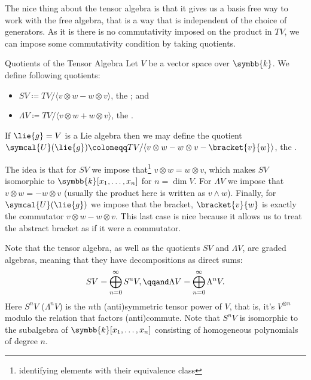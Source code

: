 \documentclass[fleqn]{NotesClass}
\renewcommand{\field}{\symbb{k}}
\newcommand{\universalEnveloping}{\symcal{U}}
\begin{document}
    The nice thing about the tensor algebra is that it gives us a basis free way to work with the free algebra, that is a way that is independent of the choice of generators.
    As it is there is no commutativity imposed on the product in \(TV\), we can impose some commutativity condition by taking quotients.
    
    \begin{dfn}{Quotients of the Tensor Algebra}{}
        Let \(V\) be a vector space over \(\field\).
        We define following quotients:
        \begin{itemize}
            \item \(SV \coloneqq TV/\langle v \otimes w - w \otimes v \rangle\), the ; and
            \item \(\Lambda V \coloneqq TV/\langle v \otimes w + w \otimes v \rangle\), the .
        \end{itemize}
        If \(\lie{g} = V\) is a Lie algebra then we may define the quotient \(\universalEnveloping(\lie{g}) \coloneqq TV/\langle v \otimes w - w \otimes v - \bracket{v}{w} \rangle\), the .
    \end{dfn}
    
    The idea is that for \(SV\) we impose that\footnote{identifying elements with their equivalence class} \(v \otimes w = w \otimes v\), which makes \(SV\) isomorphic to \(\field[x_1, \dotsc, x_n]\) for \(n = \dim V\).
    For \(\Lambda V\) we impose that \(v \otimes w = -w\otimes v\) (usually the product here is written as \(v \wedge w\)).
    Finally, for \(\universalEnveloping(\lie{g})\) we impose that the bracket, \(\bracket{v}{w}\) is exactly the commutator \(v \otimes w - w \otimes v\).
    This last case is nice because it allows us to treat the abstract bracket as if it were a commutator.
    
    Note that the tensor algebra, as well as the quotients \(SV\) and \(\Lambda V\), are graded algebras, meaning that they have decompositions as direct sums:
    \begin{equation}
        SV = \bigoplus_{n = 0}^{\infty} S^nV, \qqand \Lambda V = \bigoplus_{n = 0}^{\infty} \Lambda^n V.
    \end{equation}
    Here \(S^nV\) (\(\Lambda^nV\)) is the \(n\)th (anti)symmetric tensor power of \(V\), that is, it's \(V^{\otimes n}\) modulo the relation that factors (anti)commute.
    Note that \(S^nV\) is isomorphic to the subalgebra of \(\field[x_1, \dotsc, x_n]\) consisting of homogeneous polynomials of degree \(n\).
    
\end{document}

